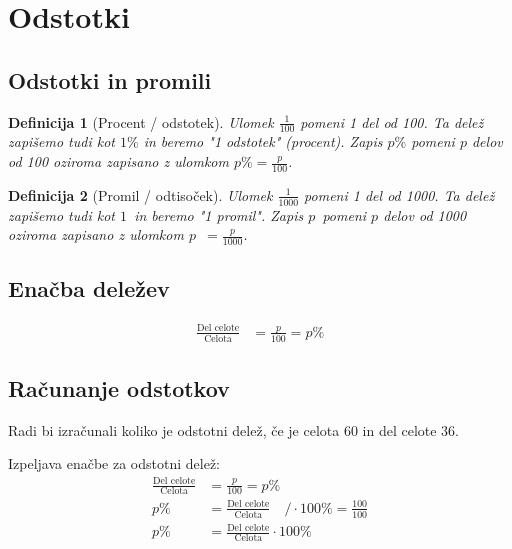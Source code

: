 \documentclass{article}
\newtheorem{definicija}{Definicija}[subsection]
\begin{document}
\pagestyle{empty}

\section{ Odstotki }

\subsection{ Odstotki in promili }

\begin{definicija}[Procent / odstotek]
    Ulomek $\frac{1}{100}$ pomeni 1 del od 100. Ta delež zapišemo tudi kot $1\%$ in beremo "1 odstotek" (procent). Zapis $p\%$ pomeni $p$ delov od 100 oziroma zapisano z ulomkom $p\% = \frac{p}{100}$.
\end{definicija}


\begin{definicija}[Promil / odtisoček]
    Ulomek $\frac{1}{1000}$ pomeni 1 del od 1000. Ta delež zapišemo tudi kot  $1$\textperthousand\ in beremo "1 promil". Zapis $p$\textperthousand\ pomeni $p$ delov od 1000 oziroma zapisano z ulomkom $p$\textperthousand\ $ = \frac{p}{1000}$.
\end{definicija}

\subsection{Enačba deležev}
\begin{align*}
    \frac{\text{Del celote}}{\text{Celota}} &= \frac{p}{100} = p \%
\end{align*}

\pagebreak
\subsection{ Računanje odstotkov }
Radi bi izračunali koliko je odstotni delež, če je celota 60 in del celote 36.

Izpeljava enačbe za odstotni delež:
\begin{align*}
    \frac{\text{Del celote}}{\text{Celota}} &= \frac{p}{100} = p\% \\
    p\% &= \frac{\text{Del celote}}{\text{Celota}} \quad / \cdot 100\% = \frac{100}{100}\\
    p\% &= \frac{\text{Del celote}}{\text{Celota}} \cdot 100\%\\
\end{align*}
\end{document}
